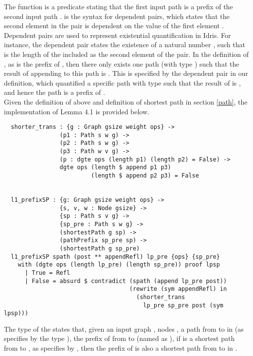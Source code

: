 The  function is a predicate stating that the first input path  is a prefix of the second input path .  is the syntax for dependent pairs, which states that the second element  in the pair is dependent on the value of the first element . Dependent pairs are used to represent existential quantification in Idris. For instance, the dependent pair  states the existence of a natural number , such that  is the length of the  included as the second element of the pair. In the definition of , as  is the prefix of , then there only exists one path (with type ) such that the result of appending  to this path is . This is specified by the dependent pair  in our definition, which quantified a specific path  with type  such that the result of  is , and hence the path  is a prefix of . 
\\

Given the definition of  above and definition of shortest path in section \ref{path}, the implementation of Lemma 4.1 is provided below. 
\begin{lstlisting}
  shorter_trans : {g : Graph gsize weight ops} ->
                (p1 : Path s w g) ->
                (p2 : Path s w g) ->
                (p3 : Path w v g) ->
                (p : dgte ops (length p1) (length p2) = False) ->
                dgte ops (length $ append p1 p3) 
                         (length $ append p2 p3) = False


  l1_prefixSP : {g: Graph gsize weight ops} ->
                {s, v, w : Node gsize} ->
                {sp : Path s v g} ->
                {sp_pre : Path s w g} ->
                (shortestPath g sp) ->
                (pathPrefix sp_pre sp) ->
                (shortestPath g sp_pre)
  l1_prefixSP spath (post ** appendRefl) lp_pre {ops} {sp_pre}
    with (dgte ops (length lp_pre) (length sp_pre)) proof lpsp
      | True = Refl
      | False = absurd $ contradict (spath (append lp_pre post))
                                    (rewrite (sym appendRefl) in 
                                      (shorter_trans 
                                        lp_pre sp_pre post (sym lpsp)))
\end{lstlisting}

The type of the  states that, given an input graph , nodes , a path  from  to  in  (as specifies by the type ), the prefix of  from  to  (named as ), if  is a shortest path from  to , as specifies by , then the prefix  of  is also a shortest path from  to  in . 
\\

